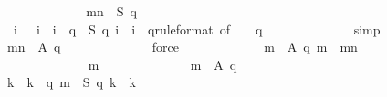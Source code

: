 \begin{isabellebody}
\ \ \ \ \ \ \ \ \ \ \isamarkupfalse%
\ \isamarkupfalse%
\ {\isachardoublequoteopen}{\isacharquery}mn\ {\isacharequal}\ {\isacharquery}S\ {\isacharparenleft}q{\isacharplus}{}{\isacharparenright}\ {}{\isachardoublequoteclose}\isanewline
\ \ \ \ \ \ \ \ \ \ \ \ \isamarkupfalse%
\ {\isacharbackquoteopen}{\isasymforall}\ i{\isachardot}\ {}\ {\isasymle}\ i\ {\isasymand}\ i\ {\isasymle}\ q\ {\isasymlongrightarrow}\ {\isacharquery}S\ {\isacharparenleft}q{\isacharplus}{}{\isacharparenright}\ i\ {\isacharequal}\ i\ {\isacharminus}\ {}{\isacharslash}q{\isacharbackquoteclose}{\isacharbrackleft}rule{\isacharunderscore}format{\isacharcomma}\ of\ {}{\isacharbrackright}\ {\isacharbackquoteopen}{}\ {\isasymle}\ q{\isacharbackquoteclose}\isanewline
\ \ \ \ \ \ \ \ \ \ \ \ \isamarkupfalse%
\ simp\isanewline
\ \ \ \ \ \ \ \ \ \ \isamarkupfalse%
\ \isamarkupfalse%
\ {\isachardoublequoteopen}{\isacharquery}mn\ {\isasymin}\ {\isacharquery}A\ {\isacharparenleft}q{\isacharplus}{}{\isacharparenright}{\isachardoublequoteclose}\isanewline
\ \ \ \ \ \ \ \ \ \ \ \ \isamarkupfalse%
\ force\isanewline
\ \ \ \ \ \ \ \ \ \ \isamarkupfalse%
\ {\isachardoublequoteopen}{\isasymforall}\ m{\isacharprime}\ {\isasymin}\ {\isacharquery}A\ {\isacharparenleft}q{\isacharplus}{}{\isacharparenright}{\isachardot}\ m{\isacharprime}\ {\isasymge}\ {\isacharquery}mn{\isachardoublequoteclose}\isanewline
\ \ \ \ \ \ \ \ \ \ \isamarkupfalse%
\isanewline
\ \ \ \ \ \ \ \ \ \ \ \ \isamarkupfalse%
\ m{\isacharprime}\isanewline
\ \ \ \ \ \ \ \ \ \ \ \ \isamarkupfalse%
\ {\isachardoublequoteopen}m{\isacharprime}\ {\isasymin}\ {\isacharquery}A\ {\isacharparenleft}q{\isacharplus}{}{\isacharparenright}{\isachardoublequoteclose}\isanewline
\ \ \ \ \ \ \ \ \ \ \ \ \isamarkupfalse%
\ \isamarkupfalse%
\ k\ \ {\isachardoublequoteopen}k\ {\isasymin}\ {\isacharbraceleft}{}{\isachardot}{\isachardot}{\isacharless}q{\isacharplus}{}{\isacharplus}{}{\isacharbraceright}{\isachardoublequoteclose}\ {\isachardoublequoteopen}m{\isacharprime}\ {\isacharequal}\ {\isacharquery}S\ {\isacharparenleft}q{\isacharplus}{}{\isacharparenright}\ k\ {\isacharslash}\ k{\isachardoublequoteclose}\isanewline
\ \ \ \ \ \ \ \ \ \ \ \ \ \ \isamarkupfalse%

\end{isabellebody}
